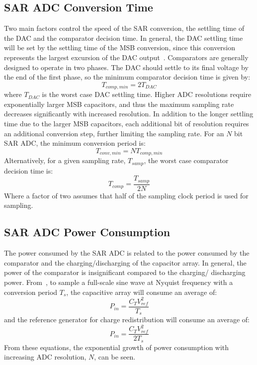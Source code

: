 \subsection{SAR ADC Conversion Time}
\label{sec:sarconversiontime}
Two main factors control the speed of the SAR conversion, the settling time of the DAC and the comparator decision time. In general, the DAC settling time will be set by the settling time of the MSB 
conversion, since this conversion represents the largest excursion of the DAC output~\cite{maximsaradc}. Comparators are generally designed to operate in two phases. The DAC should settle to its final voltage by the end of the first phase, so the minimum comparator decision time is given by: 
\begin{equation}
\label{eq:compdecisiontime}
T_{comp,min} = 2T_{DAC}
\end{equation}
where $T_{DAC}$ is the worst case DAC settling time. Higher ADC resolutions require exponentially larger MSB capacitors, and thus the maximum sampling rate decreases significantly with increased resolution. In addition to the longer settling time due to the larger MSB capacitors, each additional bit of resolution requires an additional conversion step, further limiting the sampling rate. For an $N$ bit SAR ADC, the minimum conversion period is:
\begin{equation}
\label{eq:sarminconversiontime}
T_{conv,min} = NT_{comp,min}
\end{equation}
Alternatively, for a given sampling rate, $T_{samp}$, the worst case comparator decision time is:
\begin{equation}
\label{eq:compdecisiontimegiventsamp}
T_{comp} = \dfrac{T_{samp}}{2N}
\end{equation}
Where a factor of two assumes that half of the sampling clock period is used for sampling.
\subsection{SAR ADC Power Consumption}
\label{sec:sarpowerconsumption}
The power consumed by the SAR ADC is related to the power consumed by the comparator and the charging/discharging of the capacitor array. In general, the power of the comparator is insignificant compared to the charging/
discharging power. From~\cite{5937489}, to sample a full-scale sine wave at Nyquist frequency with a conversion period $T_s$, the capacitive array will consume an average of: 
\begin{equation}
\label{eq:samppower}
P_{in} = \dfrac{C_TV_{ref}^2}{T_s}
\end{equation}
and the reference generator for charge redistribution will consume an average of:
\begin{equation}
\label{eq:refgenpower}
P_{in} = \dfrac{C_TV_{ref}^2}{2T_s}
\end{equation}
From these equations, the exponential growth of power consumption with increasing ADC resolution, $N$, can be seen.
